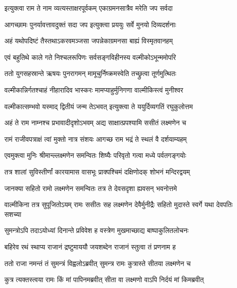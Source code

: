 \twolineshloka
{इत्युक्त्वा राम ते नाम व्यत्यस्ताक्षरपूर्वकम्}
{एकाग्रमनसात्रैव मरेति जप सर्वदा} %

\twolineshloka
{आगच्छामः पुनर्यावत्तावदुक्तं सदा जप}
{इत्युक्त्वा प्रययुः सर्वे मुनयो दिव्यदर्शनाः} %

\twolineshloka
{अहं यथोपदिष्टं तैस्तथाऽकरवमञ्जसा}
{जपन्नेकाग्रमनसा बाह्यं विस्मृतवानहम्} %

\twolineshloka
{एवं बहुतिथे काले गते निश्चलरूपिणः}
{सर्वसङ्गविहीनस्य वल्मीकोऽभून्ममोपरि} %

\twolineshloka
{ततो युगसहस्रान्ते ऋषयः पुनरागमन्}
{मामूचुर्निष्क्रमस्वेति तच्छ्रुत्वा तूर्णमुत्थितः} %

\twolineshloka
{वल्मीकान्निर्गतश्चाहं नीहारादिव भास्करः}
{मामप्याहुर्मुनिगणा वाल्मीकिस्त्वं मुनीश्वर} %

\twolineshloka
{वल्मीकात्सम्भवो यस्माद् द्वितीयं जन्म तेऽभवत्}
{इत्युक्त्वा ते ययुर्दिव्यगतिं रघुकुलोत्तम} %

\twolineshloka
{अहं ते राम नाम्नश्च प्रभावादीदृशोऽभवम्}
{अद्य साक्षात्प्रपश्यामि ससीतं लक्ष्मणेन च} %

\twolineshloka
{रामं राजीवपत्राक्षं त्वां मुक्तो नात्र संशयः}
{आगच्छ राम भद्रं ते स्थलं वै दर्शयाम्यहम्} %

\twolineshloka
{एवमुक्त्वा मुनिः श्रीमान्ल्लक्ष्मणेन समन्वितः}
{शिष्यैः परिवृतो गत्वा मध्ये पर्वतगङ्गयोः} %

\twolineshloka
{तत्र शालां सुविस्तीर्णां कारयामास वासभूः}
{प्राक्पश्चिमं दक्षिणोदक् शोभनं मन्दिरद्वयम्} %

\twolineshloka
{जानक्या सहितो रामो लक्ष्मणेन समन्वितः}
{तत्र ते देवसदृशा ह्यवसन् भवनोत्तमे} %

\fourlineindentedshloka
{वाल्मीकिना तत्र सुपूजितोऽयम्}
{रामः ससीतः सह लक्ष्मणेन}
{देवैर्मुनीद्रैः सहितो मुदास्ते}
{स्वर्गे यथा देवपतिः सशच्या} %





\twolineshloka
{सुमन्त्रोऽपि तदाऽयोध्यां दिनान्ते प्रविवेश ह}
{वस्त्रेण मुखमाच्छाद्य बाष्पाकुलितलोचनः} %

\twolineshloka
{बहिरेव रथं स्थाप्य राजानं द्रष्टुमाययौ}
{जयशब्देन राजानं स्तुत्वा तं प्रणनाम ह} %

\twolineshloka
{ततो राजा नमन्तं तं सुमन्त्रं विह्वलोऽब्रवीत्}
{सुमन्त्र रामः कुत्रास्ते सीतया लक्ष्मणेन च} %

\twolineshloka
{कुत्र त्यक्तस्त्वया रामः किं मां पापिनमब्रवीत्}
{सीता वा लक्ष्मणो वाऽपि निर्दयं मां किमब्रवीत्} %

